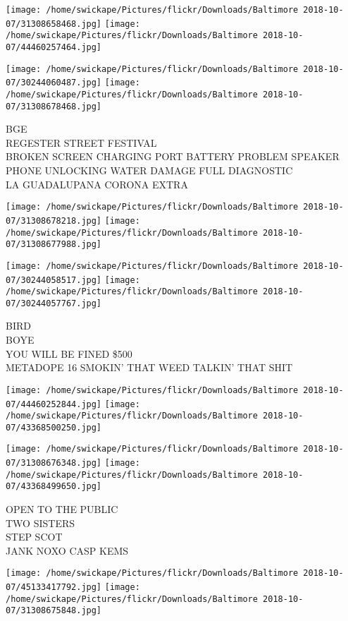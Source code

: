 \documentclass[10pt,letterpaper]{article}
\begin{document}
\texttt{[image: /home/swickape/Pictures/flickr/Downloads/Baltimore 2018-10-07/31308658468.jpg]}
\texttt{[image: /home/swickape/Pictures/flickr/Downloads/Baltimore 2018-10-07/44460257464.jpg]}

\texttt{[image: /home/swickape/Pictures/flickr/Downloads/Baltimore 2018-10-07/30244060487.jpg]}
\texttt{[image: /home/swickape/Pictures/flickr/Downloads/Baltimore 2018-10-07/31308678468.jpg]}

BGE\\
REGESTER STREET FESTIVAL\\
BROKEN SCREEN CHARGING PORT BATTERY PROBLEM SPEAKER PHONE UNLOCKING WATER DAMAGE FULL DIAGNOSTIC\\
LA GUADALUPANA CORONA EXTRA\\
\pagebreak

\texttt{[image: /home/swickape/Pictures/flickr/Downloads/Baltimore 2018-10-07/31308678218.jpg]}
\texttt{[image: /home/swickape/Pictures/flickr/Downloads/Baltimore 2018-10-07/31308677988.jpg]}

\texttt{[image: /home/swickape/Pictures/flickr/Downloads/Baltimore 2018-10-07/30244058517.jpg]}
\texttt{[image: /home/swickape/Pictures/flickr/Downloads/Baltimore 2018-10-07/30244057767.jpg]}

BIRD\\
BOYE\\
YOU WILL BE FINED \$500\\
METADOPE 16 SMOKIN' THAT WEED TALKIN' THAT SHIT\\
\pagebreak

\texttt{[image: /home/swickape/Pictures/flickr/Downloads/Baltimore 2018-10-07/44460252844.jpg]}
\texttt{[image: /home/swickape/Pictures/flickr/Downloads/Baltimore 2018-10-07/43368500250.jpg]}

\texttt{[image: /home/swickape/Pictures/flickr/Downloads/Baltimore 2018-10-07/31308676348.jpg]}
\texttt{[image: /home/swickape/Pictures/flickr/Downloads/Baltimore 2018-10-07/43368499650.jpg]}

OPEN TO THE PUBLIC\\
TWO SISTERS\\
STEP SCOT\\
JANK NOXO CASP KEMS\\
\pagebreak

\texttt{[image: /home/swickape/Pictures/flickr/Downloads/Baltimore 2018-10-07/45133417792.jpg]}
\texttt{[image: /home/swickape/Pictures/flickr/Downloads/Baltimore 2018-10-07/31308675848.jpg]}
\end{document}

